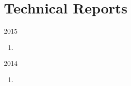 \section*{Technical Reports}

\begin{paracol}{2}
  2015
\switchcolumn
  \begin{enumerate}
    \setcounter{enumi}{\thepubcounter}
    \item {}
    \setcounter{pubcounter}{\theenumi}
  \end{enumerate}
\end{paracol}

\begin{paracol}{2}
  2014
\switchcolumn
  \begin{enumerate}
    \setcounter{enumi}{\thepubcounter}
    \item {}
    \setcounter{pubcounter}{\theenumi}
  \end{enumerate}
\end{paracol}